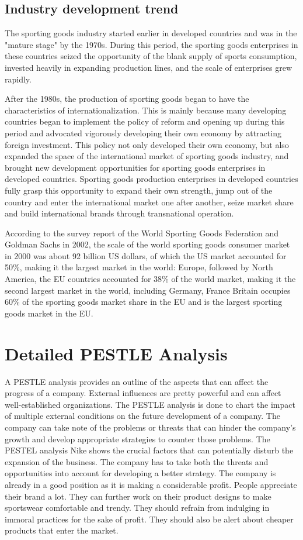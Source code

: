 \documentclass[a4paper, 12pt]{report}
\begin{document}
\subsection{Industry development trend}
The sporting goods industry started earlier in developed countries and was in the "mature stage" by the 1970s. During this period, the sporting goods enterprises in these countries seized the opportunity of the blank supply of sports consumption, invested heavily in expanding production lines, and the scale of enterprises grew rapidly.\par
After the 1980s, the production of sporting goods began to have the characteristics of internationalization. This is mainly because many developing countries began to implement the policy of reform and opening up during this period and advocated vigorously developing their own economy by attracting foreign investment. This policy not only developed their own economy, but also expanded the space of the international market of sporting goods industry, and brought new development opportunities for sporting goods enterprises in developed countries. Sporting goods production enterprises in developed countries fully grasp this opportunity to expand their own strength, jump out of the country and enter the international market one after another, seize market share and build international brands through transnational operation.\par
According to the survey report of the World Sporting Goods Federation and Goldman Sachs in 2002, the scale of the world sporting goods consumer market in 2000 was about 92 billion US dollars, of which the US market accounted for 50\%, making it the largest market in the world: Europe, followed by North America, the EU countries accounted for 38\% of the world market, making it the second largest market in the world, including Germany, France Britain occupies 60\% of the sporting goods market share in the EU and is the largest sporting goods market in the EU.\par
\section{Detailed PESTLE Analysis}
A PESTLE analysis provides an outline of the aspects that can affect the progress of a company. External influences are pretty powerful and can affect well-established organizations. The PESTLE analysis is done to chart the impact of multiple external conditions on the future development of a company. The company can take note of the problems or threats that can hinder the company's growth and develop appropriate strategies to counter those problems. The PESTEL analysis Nike shows the crucial factors that can potentially disturb the expansion of the business. The company has to take both the threats and opportunities into account for developing a better strategy. The company is already in a good position as it is making a considerable profit. People appreciate their brand a lot. They can further work on their product designs to make sportswear comfortable and trendy. They should refrain from indulging in immoral practices for the sake of profit. They should also be alert about cheaper products that enter the market.
\end{document}
